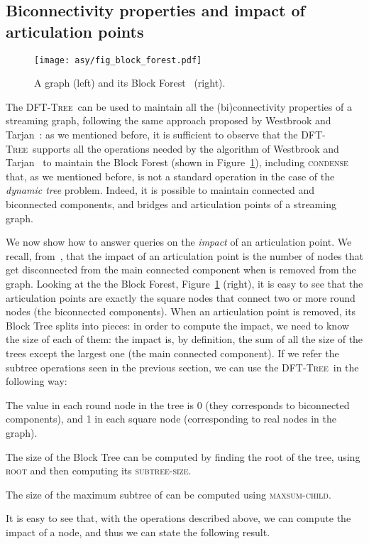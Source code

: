 \documentclass[a4paper,USenglish]{lipics}
\newcommand{\dft}{\textsc{DFT-Tree}}
\begin{document}
\subsection{Biconnectivity properties and impact of articulation points}

\begin{figure}[t]
	\centering {}\hfill 	\texttt{[image: asy/fig\_block\_forest.pdf]}
			\caption{A graph (left) and its Block Forest~\cite{WT92} (right).\label{fig:BF}}
\end{figure}

The \dft\ can be used to maintain all the (bi)connectivity properties of a streaming graph, following the same approach proposed by Westbrook and Tarjan~\cite{WT92}: as we mentioned before, it is sufficient to observe that the \dft\ supports all the operations needed by the algorithm of Westbrook and Tarjan~ to maintain the Block Forest (shown in Figure~\ref{fig:BF}), including \textsc{condense} that, as we mentioned before,  is not a standard operation in the case of the \emph{dynamic tree} problem. Indeed, it is possible to maintain connected and biconnected components, and bridges and articulation points of a streaming graph. 

We now show how to answer queries on the \emph{impact} of an articulation point. We recall, from~\cite{AFL12trac}, that the impact of an articulation point  is the number of nodes that get disconnected from the main connected component when  is removed from the graph. Looking at the the Block Forest, Figure~\ref{fig:BF} (right), it is easy to see that the articulation points are exactly the square nodes that connect two or more round nodes (the biconnected components). When an articulation point is removed, its Block Tree splits into pieces: in order to compute the impact, we need to know the size of each of them: the impact is, by definition, the sum of all the size of the trees except the largest one (the main connected component). If we refer the subtree operations seen in the previous section, we can use the \dft\ in the following way:
\begin{compactitem}
\item The value in each round node in the tree is 0 (they corresponds to biconnected components), and 1 in each square node (corresponding to real nodes in the graph).
\item The size of the Block Tree can be computed by finding the root of the tree, using \textsc{root} and then computing its \textsc{subtree-size}.
\item The size of the maximum subtree of  can be computed using \textsc{maxsum-child}.
\end{compactitem}
It is easy to see that, with the operations described above, we can compute the impact of a node, and thus we can state the following result.
\end{document}

